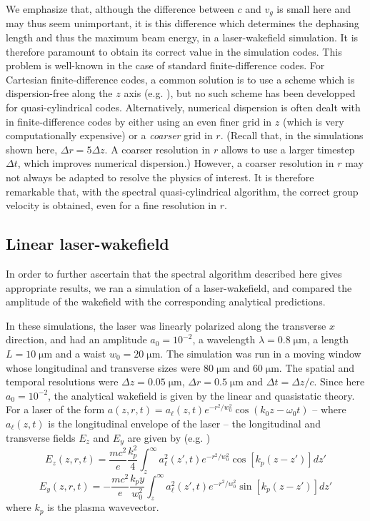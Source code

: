 \documentclass[1p,times,authoryear]{elsarticle}
\begin{document}
We emphasize that, although the difference between $c$ and $v_g$ is
small here and may thus seem unimportant, it is this difference which determines
the dephasing length and thus the
maximum beam energy, in a laser-wakefield simulation. It is therefore
paramount to obtain its correct value in the simulation codes. This
problem is well-known in the case of standard finite-difference
codes. For Cartesian finite-difference codes, a common solution is to
use a scheme which is dispersion-free along the $z$ axis 
(e.g. \citep{Karkkainen,Pukhov,Nuter}), but no such scheme has been
developped for quasi-cylindrical codes. Alternatively, numerical dispersion is often 
dealt with in finite-difference codes by either using an even finer grid in
$z$ (which is very computationally expensive) or
a \emph{coarser} grid in $r$. (Recall that, in the simulations shown here, $\Delta r = 5\Delta
z$. A coarser resolution in $r$ allows to
use a larger timestep $\Delta t$, which improves numerical
dispersion.) However, a coarser resolution in $r$ may not always be
adapted to resolve the physics of interest. It is therefore remarkable 
that, with the spectral quasi-cylindrical algorithm, the correct group
velocity is obtained, even for a fine resolution in $r$. 

\subsection{Linear laser-wakefield}

In order to further ascertain that the spectral algorithm described here gives
appropriate results, we ran a simulation of a laser-wakefield, and
compared the amplitude of the wakefield with the corresponding analytical predictions.

In these simulations, the laser was linearly polarized along the
transverse $x$ direction, and had an amplitude $a_0 = 10^{-2}$, a
wavelength $\lambda=0.8 \;\mathrm{\mu m}$, a length $L=10\;\mathrm{\mu
m}$ and a waist $w_0 = 20\;\mathrm{\mu m}$. The simulation was run in
a moving window whose longitudinal and transverse sizes were $80 \;
\mathrm{\mu m}$ and $60 \; \mathrm{\mu m}$. The spatial and temporal
resolutions were $\Delta z = 0.05 \; \mathrm{\mu m}$, $\Delta r = 0.5
\;\mathrm{\mu m}$ and $\Delta t = \Delta z/c$. Since here $a_0 =
10^{-2}$, the analytical wakefield is given by
the linear and quasistatic theory. For a laser of the
form $a(z, r, t)= a_\ell(z, t) e^{-r^2/w_0^2} \cos(k_0z-\omega_0 t)$ --
where $a_\ell(z, t)$ is the longitudinal envelope of the laser -- the
longitudinal and transverse fields $E_z$ and $E_y$ are given by (e.g. \citep{EsareyRMP2009})
\begin{equation} 
E_z(z, r, t) = \frac{mc^2}{e} \frac{k_p^2}{4}\int_{z}^{\infty} 
a_\ell^2(z', t) e^{-r^2/w_0^2} \cos[k_p(z-z')]dz' \label{eq:analytical-Ez}
\end{equation}
\begin{equation}
E_y(z, r, t) = -\frac{mc^2}{e} \frac{k_p y}{w_0^2}\int_{z}^{\infty} 
a_\ell^2(z', t) e^{-r^2/w_0^2} \sin[k_p(z-z')]dz' \label{eq:analytical-Ey}
\end{equation}
\noindent where $k_p$ is the plasma wavevector.
\end{document}

